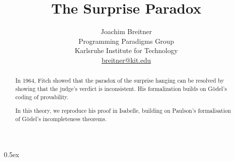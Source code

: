 \documentclass[11pt,a4paper]{article}
\begin{document}
\title{The Surprise Paradox}
\author{Joachim Breitner\\
Programming Paradigms Group\\
Karlsruhe Institute for Technology\\
\url{breitner@kit.edu}}

\maketitle

\begin{abstract}
In 1964, Fitch showed that the paradox of the surprise hanging can be resolved by showing that the judge’s verdict is inconsistent. His formalization builds on Gödel’s coding of provability.

In this theory, we reproduce his proof in Isabelle, building on Paulson’s formalisation of Gödel’s incompleteness theorems.
\end{abstract}

\tableofcontents

\bigskip

\parindent 0pt\parskip 0.5ex





\end{document}
